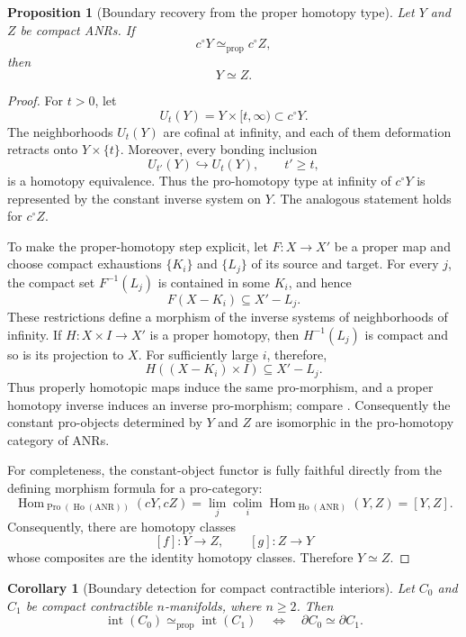 \documentclass[10pt,reqno]{amsart}
\numberwithin{equation}{section}
\newtheorem{proposition}{Proposition}
\newtheorem{corollary}{Corollary}
\theoremstyle{definition}
\theoremstyle{remark}
\newcommand{\Int}{\operatorname{int}}
\newcommand{\simeqp}{\simeq_{\mathrm{prop}}}
\begin{document}
\begin{proposition}[Boundary recovery from the proper homotopy type]
\label{prop:boundary-recovery}
Let \(Y\) and \(Z\) be compact ANRs.  If
\[
c^\circ Y\simeqp c^\circ Z,
\]
then
\[
Y\simeq Z.
\]
\end{proposition}

\begin{proof}
For \(t>0\), let
\[
U_t(Y)=Y\times[t,\infty)\subset c^\circ Y.
\]
The neighborhoods \(U_t(Y)\) are cofinal at infinity, and each of
them deformation retracts onto \(Y\times\{t\}\).  Moreover, every
bonding inclusion
\[
U_{t'}(Y)\hookrightarrow U_t(Y),
\qquad t'\geq t,
\]
is a homotopy equivalence.  Thus the pro-homotopy type at infinity of
\(c^\circ Y\) is represented by the constant inverse system on
\(Y\).  The analogous statement holds for \(c^\circ Z\).

To make the proper-homotopy step explicit, let \(F:X\to X'\) be a
proper map and choose compact exhaustions \(\{K_i\}\) and \(\{L_j\}\)
of its source and target.  For every \(j\), the compact set
\(F^{-1}(L_j)\) is contained in some \(K_i\), and hence
\[
F(X-K_i)\subseteq X'-L_j.
\]
These restrictions define a morphism of the inverse systems of
neighborhoods of infinity.  If \(H:X\times I\to X'\) is a proper
homotopy, then \(H^{-1}(L_j)\) is compact and so is its projection to
\(X\).  For sufficiently large \(i\), therefore,
\[
H((X-K_i)\times I)\subseteq X'-L_j.
\]
Thus properly homotopic maps induce the same pro-morphism, and a proper
homotopy inverse induces an inverse pro-morphism; compare
\cite[\S3.3.2 and the proof of Proposition~3.4.12]{GuilbaultEnds}.
Consequently the constant pro-objects determined by \(Y\) and \(Z\)
are isomorphic in the pro-homotopy category of ANRs.

For completeness, the constant-object functor is fully faithful
directly from the defining morphism formula for a pro-category:
\[
\operatorname{Hom}_{\operatorname{Pro}(\operatorname{Ho}(\mathrm{ANR}))}
  (cY,cZ)
=
\lim_j\operatorname*{colim}_i
\operatorname{Hom}_{\operatorname{Ho}(\mathrm{ANR})}(Y,Z)
=
[Y,Z].
\]
Consequently, there are homotopy classes
\[
[f]\colon Y\longrightarrow Z,
\qquad
[g]\colon Z\longrightarrow Y
\]
whose composites are the identity homotopy classes.  Therefore
\(Y\simeq Z\).
\end{proof}

\begin{corollary}[Boundary detection for compact contractible
interiors]\label{cor:boundary-detection}
Let \(C_0\) and \(C_1\) be compact contractible \(n\)-manifolds,
where \(n\geq2\).  Then
\[
\Int(C_0)\simeqp\Int(C_1)
\quad\Longleftrightarrow\quad
\partial C_0\simeq\partial C_1.
\]
\end{corollary}
\end{document}
